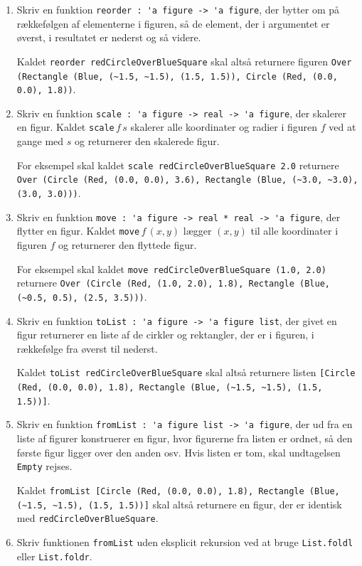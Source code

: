 \documentclass[a4paper,12pt]{article}
\begin{document}
\begin{enumerate}[{5I}1]

\item Skriv en funktion \lstinline{reorder : 'a figure -> 'a figure},
  der bytter om på rækkefølgen af elementerne i figuren, så de
  element, der i argumentet er øverst, i resultatet er nederst og så
  videre.

  Kaldet \lstinline{reorder redCircleOverBlueSquare} skal altså
  returnere figuren\newline
  \lstinline{Over (Rectangle (Blue, (~1.5, ~1.5), (1.5, 1.5)), Circle (Red, (0.0, 0.0), 1.8))}.

\item Skriv en funktion \lstinline{scale : 'a figure -> real -> 'a figure},
  der skalerer en figur.  Kaldet \lstinline{scale}\,$f\,s$ skalerer
  alle koordinater og radier i figuren $f$ ved at gange med $s$ og
  returnerer den skalerede figur.

  For eksempel skal kaldet \lstinline{scale redCircleOverBlueSquare 2.0}
  returnere\newline
  \lstinline{Over (Circle (Red, (0.0, 0.0), 3.6), Rectangle (Blue, (~3.0, ~3.0), (3.0, 3.0)))}.

\item Skriv en funktion \lstinline{move : 'a figure -> real * real -> 'a figure},
  der flytter en figur.  Kaldet \lstinline{move}\,$f\,(x,y)$ lægger
  $(x,y)$ til alle koordinater i figuren $f$ og returnerer den
  flyttede figur.

  For eksempel skal kaldet \lstinline{move redCircleOverBlueSquare (1.0, 2.0)}
  returnere\newline
  \lstinline{Over (Circle (Red, (1.0, 2.0), 1.8), Rectangle (Blue, (~0.5, 0.5), (2.5, 3.5)))}.

\item Skriv en funktion \lstinline{toList : 'a figure -> 'a figure list},
  der givet en figur returnerer en liste af de cirkler og rektangler,
  der er i figuren, i rækkefølge fra øverst til nederst.

  Kaldet \lstinline{toList redCircleOverBlueSquare}
  skal altså returnere listen\newline
  \lstinline{[Circle (Red, (0.0, 0.0), 1.8), Rectangle (Blue, (~1.5, ~1.5), (1.5, 1.5))]}.

\item Skriv en funktion \lstinline{fromList : 'a figure list -> 'a figure},
  der ud fra en liste af figurer konstruerer en figur, hvor figurerne
  fra listen er ordnet, så den første figur ligger over den anden osv.
  Hvis listen er tom, skal undtagelsen \lstinline{Empty} rejses.

  Kaldet\newline
  \lstinline{fromList [Circle (Red, (0.0, 0.0), 1.8), Rectangle (Blue, (~1.5, ~1.5), (1.5, 1.5))]}
  skal altså returnere en figur, der er identisk med
  \lstinline{redCircleOverBlueSquare}.

\item Skriv funktionen \lstinline{fromList} uden eksplicit rekursion
  ved at bruge \lstinline{List.foldl} eller \lstinline{List.foldr}.

\end{enumerate}
\end{document}
